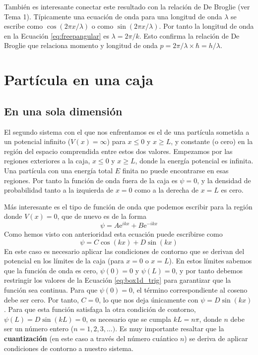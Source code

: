 \documentclass{tufte-handout}
\begin{document}
También es interesante conectar este resultado 
con la relación de De Broglie (ver Tema 1). 
Típicamente una ecuación de
onda para una longitud de onda $\lambda$ se
escribe como $\cos(2\pi x/\lambda)$ o como
$\sin(2\pi x/\lambda)$. Por tanto la longitud de
onda en la Ecuación \ref{eq:freepangular} es
$\lambda=2\pi/k$. Esto confirma la relación de 
De Broglie que relaciona momento y longitud de
onda $p=2\pi/\lambda\times\hbar=h/\lambda$.

\section{Partícula en una caja}
\subsection{En una sola dimensión}
El segundo sistema con el que nos enfrentamos es el de una partícula
sometida a un potencial infinito ($V(x)=\infty$) para $x\leq 0$ y $x\geq L$, y 
constante (o cero) en la región del espacio comprendida entre estos
dos valores. Empezamos por las regiones exteriores a la caja,
$x\leq 0$ y $x\geq L$, donde la energía potencial es infinita.
Una partícula con una energía total $E$ finita no puede
encontrarse en esas regiones. Por tanto la función de onda fuera de la caja
es $\psi=0$, y la densidad de probabilidad tanto a la izquierda
de $x=0$ como a la derecha de $x=L$ es cero.

Más interesante es el tipo de función de onda que podemos
escribir para la región donde $V(x)=0$, que de nuevo es de
la forma
\begin{equation}
    \psi=A\mathrm{e}^{ikx} + B\mathrm{e}^{-ikx}
\end{equation}
Como hemos visto con anterioridad esta ecuación puede 
escribirse como 
\begin{equation}
    \psi=C\cos(kx) + D\sin(kx)\label{eq:box1d_trig}
\end{equation}
En este caso es necesario aplicar las condiciones de 
contorno que se derivan del potencial en los límites de
la caja (para $x=0$ o $x=L$). En estos límites sabemos que 
la función de onda es cero, $\psi(0)=0$ y $\psi(L)=0$, y por
tanto debemos restringir los valores de la Ecuación 
\ref{eq:box1d_trig} para garantizar que la función sea 
continua. Para que $\psi(0)=0$, el término correspondiente
al coseno debe ser cero. Por tanto, $C=0$, lo que nos deja
únicamente con  $\psi=D\sin(kx)$. Para que esta función
satisfaga la otra condición de contorno, 
$\psi(L)=D\sin(kL)=0$, es necesario que se cumpla $kL=n\pi$,
donde $n$ debe ser un número entero ($n=1,2,3,...)$. Es
muy importante resaltar que la \textbf{cuantización} 
(en este caso a través del número cuántico $n$) se deriva de
aplicar condiciones de contorno a nuestro sistema.
\end{document}
